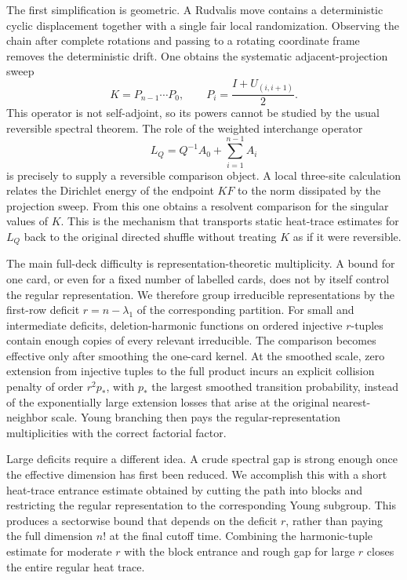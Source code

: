 \documentclass[11pt]{article}
\theoremstyle{remark}
\begin{document}
The first simplification is geometric.  A Rudvalis move contains a deterministic cyclic displacement together with a single fair local randomization.  Observing the chain after complete rotations and passing to a rotating coordinate frame removes the deterministic drift.  One obtains the systematic adjacent-projection sweep
\[
 K=P_{n-1}\cdots P_0,
 \qquad P_i=\frac{I+U_{(i,i+1)}}2.
\]
This operator is not self-adjoint, so its powers cannot be studied by the usual reversible spectral theorem.  The role of the weighted interchange operator
\[
 L_Q=Q^{-1}A_0+\sum_{i=1}^{n-1}A_i
\]
is precisely to supply a reversible comparison object.  A local three-site calculation relates the Dirichlet energy of the endpoint $KF$ to the norm dissipated by the projection sweep.  From this one obtains a resolvent comparison for the singular values of $K$.  This is the mechanism that transports static heat-trace estimates for $L_Q$ back to the original directed shuffle without treating $K$ as if it were reversible.

The main full-deck difficulty is representation-theoretic multiplicity.  A bound for one card, or even for a fixed number of labelled cards, does not by itself control the regular representation.  We therefore group irreducible representations by the first-row deficit $r=n-\lambda_1$ of the corresponding partition.  For small and intermediate deficits, deletion-harmonic functions on ordered injective $r$-tuples contain enough copies of every relevant irreducible.  The comparison becomes effective only after smoothing the one-card kernel.  At the smoothed scale, zero extension from injective tuples to the full product incurs an explicit collision penalty of order $r^2p_*$, with $p_*$ the largest smoothed transition probability, instead of the exponentially large extension losses that arise at the original nearest-neighbor scale.  Young branching then pays the regular-representation multiplicities with the correct factorial factor.

Large deficits require a different idea.  A crude spectral gap is strong enough once the effective dimension has first been reduced.  We accomplish this with a short heat-trace entrance estimate obtained by cutting the path into blocks and restricting the regular representation to the corresponding Young subgroup.  This produces a sectorwise bound that depends on the deficit $r$, rather than paying the full dimension $n!$ at the final cutoff time.  Combining the harmonic-tuple estimate for moderate $r$ with the block entrance and rough gap for large $r$ closes the entire regular heat trace.
\end{document}
